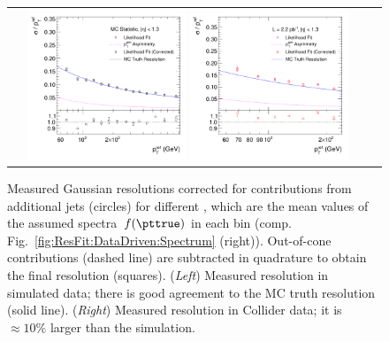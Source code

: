 \begin{figure}[ht]
 \centering
  \begin{tabular}{cc}
    \includegraphics[width=0.45\textwidth]{figures/MaxLike_Eta00-13_ExtraResoBottomRatio}
    \includegraphics[width=0.45\textwidth]{figures/MaxLike_Data132440-144011_Eta00-13_ExtraResoBottomRatio}\\
  \end{tabular}
  \caption{Measured Gaussian resolutions corrected for
    contributions from additional jets (circles) for different \ptref,
    which are the mean values of the assumed spectra~$f(\pttrue)$
    in each \ptave bin (comp. Fig.~\ref{fig:ResFit:DataDriven:Spectrum}
    (right)).
    Out-of-cone contributions (dashed line) are subtracted in
    quadrature to obtain the final resolution (squares).
    (\textit{Left}) Measured resolution in simulated data; there is good
    agreement to the MC truth resolution (solid line).
    (\textit{Right}) Measured resolution in Collider data; it is
    $\approx10\%$ larger than the simulation.
  }
  \label{fig:ResFit:ResoGauss}
\end{figure}
